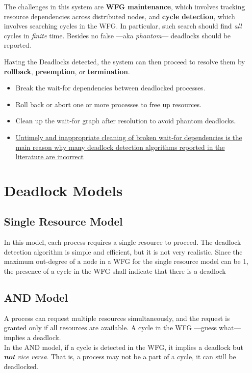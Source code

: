 The challenges in this system are \textbf{WFG maintenance}, which involves tracking resource dependencies across distributed nodes, and \textbf{cycle detection}, which involves searching cycles in the WFG. 
In particular, such search should find \textit{all} cycles in \textit{finite} time. Besides no false ---aka \textit{phantom}--- deadlocks should be reported.

{Having the Deadlocks detected, the system can then proceed to resolve them by \textbf{rollback}, \textbf{preemption}, or \textbf{termination}.\ns
\begin{itemize}
	\item Break the wait-for dependencies between deadlocked processes.
	\item Roll back or abort one or more processes to free up resources.
	\item Clean up the wait-for graph after resolution to avoid phantom deadlocks.
	\item \ul{Untimely and inappropriate cleaning of broken wait-for dependencies is the main reason why many deadlock detection algorithms reported in the literature are incorrect}
\end{itemize}}

\section{Deadlock Models}
\subsection{Single Resource Model}
In this model, each process requires a single resource to proceed. The deadlock detection algorithm is simple and efficient, but it is not very realistic.
Since the maximum out-degree of a node in a WFG for the single resource model can be 1, the presence of a cycle in the WFG shall indicate that there is a deadlock

\subsection{AND Model}
A process can request multiple resources simultaneously, and the request is granted only if all resources are available.
A cycle in the WFG ---guess what--- implies a deadlock.\\
In the AND model, if a cycle is detected in the WFG, it implies a deadlock but \textit{\textbf{not} vice versa}. That is, a process may not be a part of a cycle, it can still be deadlocked.

